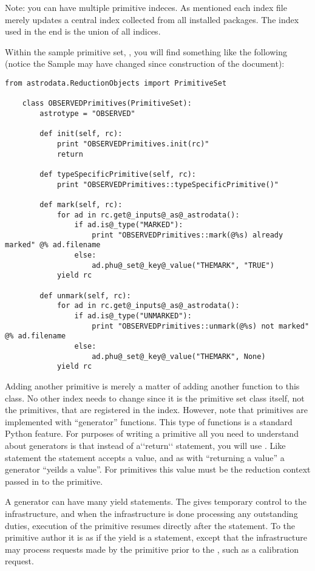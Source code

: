 \documentclass[letterpaper,10pt,english]{sphinxmanual}
\begin{document}
Note: you can have multiple primitive indeces. As mentioned each index file
merely updates a central index collected from all installed packages.
The index used in the end is the union of all indices.

Within the sample primitive set, ,
you will find something like the following (notice
the Sample may have changed since construction of the document):

\begin{Verbatim}[commandchars=@\[\]]
from astrodata.ReductionObjects import PrimitiveSet

    class OBSERVEDPrimitives(PrimitiveSet):
        astrotype = "OBSERVED"

        def init(self, rc):
            print "OBSERVEDPrimitives.init(rc)"
            return

        def typeSpecificPrimitive(self, rc):
            print "OBSERVEDPrimitives::typeSpecificPrimitive()"

        def mark(self, rc):
            for ad in rc.get@_inputs@_as@_astrodata():
                if ad.is@_type("MARKED"):
                    print "OBSERVEDPrimitives::mark(@%s) already marked" @% ad.filename
                else:
                    ad.phu@_set@_key@_value("THEMARK", "TRUE")
            yield rc

        def unmark(self, rc):
            for ad in rc.get@_inputs@_as@_astrodata():
                if ad.is@_type("UNMARKED"):
                    print "OBSERVEDPrimitives::unmark(@%s) not marked" @% ad.filename
                else:
                    ad.phu@_set@_key@_value("THEMARK", None)
            yield rc
\end{Verbatim}

Adding another primitive is merely a matter of adding another function to this
class.  No other index needs to change since it is the primitive set class
itself, not the primitives, that are registered in the index. However, note that
primitives are implemented with ``generator'' functions. This type of functions
is a standard Python feature. For purposes of writing a primitive all you need
to understand about generators is that instead of a{}`{}`return{}`{}` statement, you
will use .  Like  statement the  statement accepts a
value, and as with ``returning a value'' a generator ``yeilds a value''.
For primitives this value
must be the reduction context passed in to the primitive.

A generator can have many yield statements.  The  gives temporary
control to the infrastructure, and when the infrastructure is done processing
any outstanding duties, execution of the primitive resumes directly after the
 statement. To the primitive author it is as if the yield is a 
statement, except that the infrastructure may process requests made by the
primitive prior to the , such as a calibration request.
\end{document}
